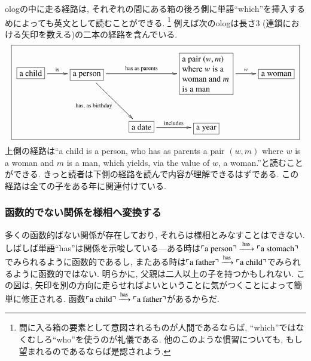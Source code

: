 ologの中に走る経路は, それぞれの間にある箱の後ろ側に単語``which''を挿入するめによっても英文として読むことができる.
\footnote{間に入る箱の要素として意図されるものが人間であるならば, ``which''ではなくむしろ``who''を使うのが礼儀である. 他のこのような慣習についても, もし望まれるのであるならば是認されよう.}
例えば次のologは長さ3 (連鎖における矢印を数える)の二本の経路を含んでいる. {\small\begin{align}\label{olog:paths}\fbox{\xymatrixnocompile{\fbox{a child}\LA{r}{is}&\fbox{a person}\LA{rr}{has as parents}\LAL{dr}{has, as birthday}&&\obox{}{.8in}{\rr a pair $(w,m)$ where $w$ is a woman and $m$ is a man}\LA{r}{$w$}&\fbox{a woman}\\&&\fbox{a date}\LA{r}{includes}&\fbox{a year}}}\end{align} } 上側の経路は``a child is a person, who has as parents a pair $(w,m)$ where $w$ is a woman and $m$ is a man, which yields, via the value of $w$, a woman.''と読むことができる. きっと読者は下側の経路を読んで内容が理解できるはずである. この経路は全ての子をある年に関連付けている.



\subsubsection{函数的でない関係を様相へ変換する}\label{sec:relations}


多くの函数的ばない関係が存在しており, それらは様相とみなすことはできない. しばしば単語``has''は関係を示唆している---ある時は$\fakebox{a person}\To{\tn{ has }}\fakebox{a stomach}$でみられるように函数的であるし, またある時は$\fakebox{a father}\To{\tn{has}}\fakebox{a child}$でみられるように函数的ではない. 明らかに, 父親は二人以上の子を持つかもしれない. この図は, 矢印を別の方向に走らせればよいということに気がつくことによって簡単に修正される. 函数$\fakebox{a child}\To{\tn{has}}\fakebox{a father}$があるからだ.

